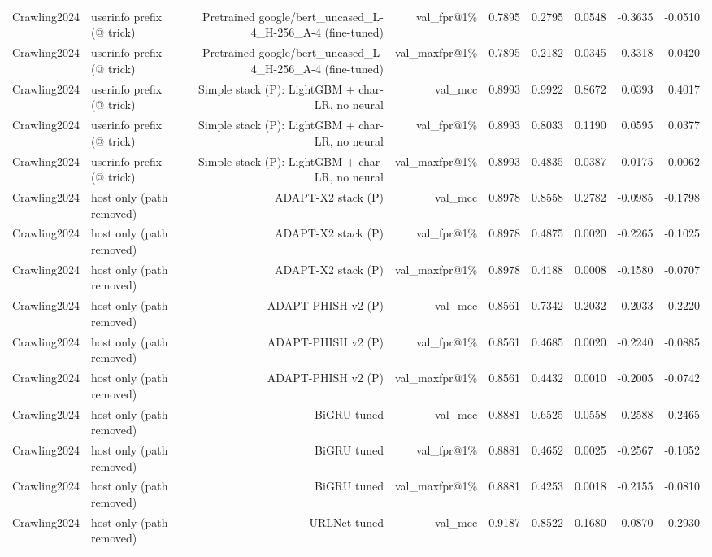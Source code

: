 \begin{table}[t]
\begin{tabular}{llrrrrrrr}
Crawling2024 & userinfo prefix (@ trick) & Pretrained google/bert\_uncased\_L-4\_H-256\_A-4 (fine-tuned) & val\_fpr@1\% & 0.7895 & 0.2795 & 0.0548 & -0.3635 & -0.0510 \\
Crawling2024 & userinfo prefix (@ trick) & Pretrained google/bert\_uncased\_L-4\_H-256\_A-4 (fine-tuned) & val\_maxfpr@1\% & 0.7895 & 0.2182 & 0.0345 & -0.3318 & -0.0420 \\
Crawling2024 & userinfo prefix (@ trick) & Simple stack (P): LightGBM + char-LR, no neural & val\_mcc & 0.8993 & 0.9922 & 0.8672 & 0.0393 & 0.4017 \\
Crawling2024 & userinfo prefix (@ trick) & Simple stack (P): LightGBM + char-LR, no neural & val\_fpr@1\% & 0.8993 & 0.8033 & 0.1190 & 0.0595 & 0.0377 \\
Crawling2024 & userinfo prefix (@ trick) & Simple stack (P): LightGBM + char-LR, no neural & val\_maxfpr@1\% & 0.8993 & 0.4835 & 0.0387 & 0.0175 & 0.0062 \\
Crawling2024 & host only (path removed) & ADAPT-X2 stack (P) & val\_mcc & 0.8978 & 0.8558 & 0.2782 & -0.0985 & -0.1798 \\
Crawling2024 & host only (path removed) & ADAPT-X2 stack (P) & val\_fpr@1\% & 0.8978 & 0.4875 & 0.0020 & -0.2265 & -0.1025 \\
Crawling2024 & host only (path removed) & ADAPT-X2 stack (P) & val\_maxfpr@1\% & 0.8978 & 0.4188 & 0.0008 & -0.1580 & -0.0707 \\
Crawling2024 & host only (path removed) & ADAPT-PHISH v2 (P) & val\_mcc & 0.8561 & 0.7342 & 0.2032 & -0.2033 & -0.2220 \\
Crawling2024 & host only (path removed) & ADAPT-PHISH v2 (P) & val\_fpr@1\% & 0.8561 & 0.4685 & 0.0020 & -0.2240 & -0.0885 \\
Crawling2024 & host only (path removed) & ADAPT-PHISH v2 (P) & val\_maxfpr@1\% & 0.8561 & 0.4432 & 0.0010 & -0.2005 & -0.0742 \\
Crawling2024 & host only (path removed) & BiGRU tuned & val\_mcc & 0.8881 & 0.6525 & 0.0558 & -0.2588 & -0.2465 \\
Crawling2024 & host only (path removed) & BiGRU tuned & val\_fpr@1\% & 0.8881 & 0.4652 & 0.0025 & -0.2567 & -0.1052 \\
Crawling2024 & host only (path removed) & BiGRU tuned & val\_maxfpr@1\% & 0.8881 & 0.4253 & 0.0018 & -0.2155 & -0.0810 \\
Crawling2024 & host only (path removed) & URLNet tuned & val\_mcc & 0.9187 & 0.8522 & 0.1680 & -0.0870 & -0.2930 \\

\end{tabular}
\end{table}
